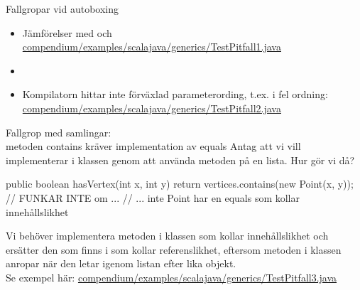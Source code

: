 \begin{Slide}{Fallgropar vid autoboxing}
\begin{itemize}
\item Jämförelser med \code{==} och \code{!=} \\
\href{https://github.com/lunduniversity/introprog/blob/master/compendium/examples/scalajava/generics/TestPitfall1.java}
{\SlideFontSmall  compendium/examples/scalajava/generics/TestPitfall1.java}
\item[]
\item Kompilatorn hittar inte förväxlad parameterording, t.ex.  i fel ordning: \sout{}\\
\href{https://github.com/lunduniversity/introprog/blob/master/compendium/examples/scalajava/generics/TestPitfall2.java}
{\SlideFontSmall compendium/examples/scalajava/generics/TestPitfall2.java}
\end{itemize}
\end{Slide}

\begin{Slide}{Fallgrop med samlingar: \\ metoden contains kräver implementation av equals}\SlideFontSmall
Antag att vi vill implementerar   i klassen  genom att använda metoden  på en lista. Hur gör vi då?
\pause
\begin{Code}[numberstyle=,language=Java]
public boolean hasVertex(int x, int y) {  
    return vertices.contains(new Point(x, y)); // FUNKAR INTE om ...
    // ... inte Point har en equals som kollar innehållslikhet
}
\end{Code}
Vi behöver implementera metoden  i klassen  som kollar innehållslikhet och ersätter den  som finns i  som kollar referenslikhet, eftersom metoden  i klassen  anropar  när den letar igenom listan efter lika objekt. \\
Se exempel här: \href{https://github.com/lunduniversity/introprog/tree/master/compendium/examples/scalajava/generics/TestPitfall3.java}{compendium/examples/scalajava/generics/TestPitfall3.java} \\


\end{Slide}


